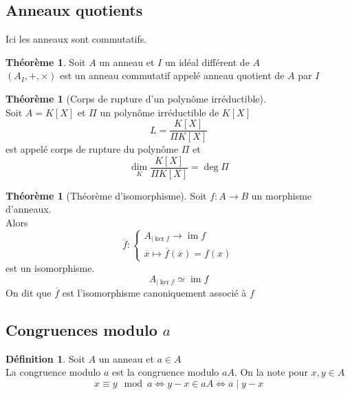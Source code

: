 \documentclass[10pt,a4paper]{article}
\theoremstyle{definition}
\newtheorem{theorem}[proposition]{Théorème}
\newtheorem{definition}[proposition]{Définition}
\DeclareMathOperator{\im}{im}
\begin{document}
\subsection{Anneaux quotients}
Ici les anneaux sont commutatifs.
\begin{theorem}
Soit $A$ un anneau et $I$ un idéal différent de $A$ \\
$(A_I, +, \times)$ est un anneau commutatif appelé anneau quotient de $A$ par $I$
\end{theorem}
\begin{theorem}[Corps de rupture d'un polynôme irréductible]
\hfill \\
Soit $A = K[X]$ et $\Pi$ un polynôme irréductible de $K[X]$
\[ L = \frac{K[X]}{\Pi K[X]} \]
est appelé corps de rupture du polynôme $\Pi$ et
\[ \underset{K}{\dim} \frac{K[X]}{\Pi K[X]} = \deg \Pi \]
\end{theorem}
\begin{theorem}[Théorème d'isomorphisme]
Soit $f : A \to B$ un morphisme d'anneaux. \\
Alors
\[ \overline{f}: \begin{cases}
A_{|\ker f} \to \im f \\
\overline{x} \mapsto \overline{f}(\overline{x}) = f(x)
\end{cases}\]
est un isomorphisme.
\[ A_{|\ker f} \simeq \im f \]
On dit que $\overline{f}$ est l'isomorphisme canoniquement associé à $f$
\end{theorem}

\subsection{Congruences modulo $a$}
\begin{definition}
Soit $A$ un anneau et $a \in A$ \\
La congruence modulo $a$ est la congruence modulo $a A$. On la note pour $x, y \in A$
\[ x \equiv y \mod a \iff y - x \in a A \iff a \mid y - x \]
\end{definition}
\end{document}
